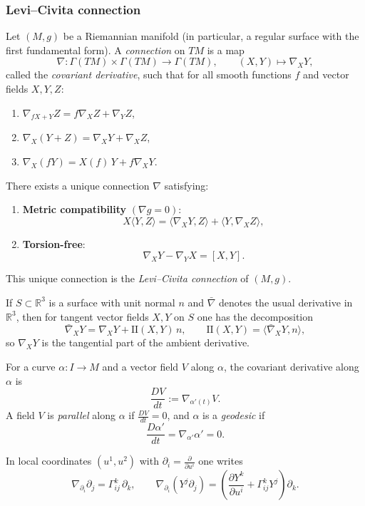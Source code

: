 \documentclass[12pt,a4paper]{article}
\theoremstyle{plain}
\theoremstyle{definition}      %
\begin{document}
	\subsubsection*{Levi--Civita connection}
	
	Let $(M,g)$ be a Riemannian manifold (in particular, a regular surface with the first fundamental form).
	A \emph{connection} on $TM$ is a map
	\[
	\nabla:\Gamma(TM)\times \Gamma(TM)\to \Gamma(TM),\qquad (X,Y)\mapsto \nabla_X Y,
	\]
	called the \emph{covariant derivative}, such that for all smooth functions $f$ and vector fields $X,Y,Z$:
	\begin{enumerate}
		\item $\nabla_{fX+Y}Z = f\nabla_X Z + \nabla_Y Z$,
		\item $\nabla_X(Y+Z)=\nabla_XY+\nabla_XZ$,
		\item $\nabla_X(fY)=X(f)\,Y + f\nabla_XY$.
	\end{enumerate}
	
	\medskip
	There exists a unique connection $\nabla$ satisfying:
	\begin{enumerate}
		\item \textbf{Metric compatibility} $(\nabla g=0)$:
		\[
		X\langle Y,Z\rangle = \langle \nabla_X Y, Z\rangle + \langle Y,\nabla_X Z\rangle,
		\]
		\item \textbf{Torsion-free}:
		\[
		\nabla_X Y - \nabla_Y X = [X,Y].
		\]
	\end{enumerate}
	This unique connection is the \emph{Levi--Civita connection} of $(M,g)$.
	
	\medskip
	If $S\subset\mathbb{R}^3$ is a surface with unit normal $n$ and $\bar\nabla$ denotes the usual derivative in
	$\mathbb{R}^3$, then for tangent vector fields $X,Y$ on $S$ one has the decomposition
	\[
	\bar\nabla_X Y = \nabla_X Y + \mathrm{II}(X,Y)\,n,
	\qquad
	\mathrm{II}(X,Y)=\langle \bar\nabla_X Y, n\rangle,
	\]
	so $\nabla_XY$ is the tangential part of the ambient derivative.
	
	\medskip
	For a curve $\alpha:I\to M$ and a vector field $V$ along $\alpha$, the covariant derivative along $\alpha$ is
	\[
	\frac{DV}{dt}:=\nabla_{\alpha'(t)}V.
	\]
	A field $V$ is \emph{parallel} along $\alpha$ if $\frac{DV}{dt}=0$, and $\alpha$ is a \emph{geodesic} if
	\[
	\frac{D\alpha'}{dt}=\nabla_{\alpha'}\alpha'=0.
	\]
	
	\medskip
	In local coordinates $(u^1,u^2)$ with $\partial_i=\frac{\partial}{\partial u^i}$ one writes
	\[
	\nabla_{\partial_i}\partial_j=\Gamma^{k}_{ij}\,\partial_k,
	\qquad
	\nabla_{\partial_i}(Y^j\partial_j)
	=
	\left(\frac{\partial Y^k}{\partial u^i}+\Gamma^{k}_{ij}Y^j\right)\partial_k.
	\]
	
\end{document}
